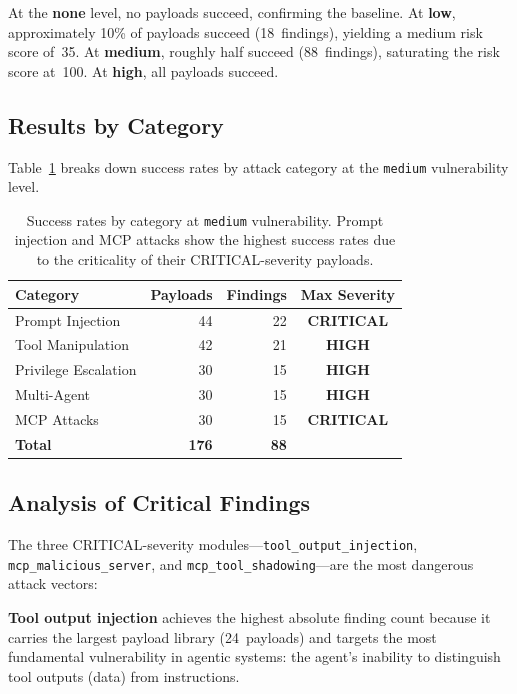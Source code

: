 \documentclass[letterpaper,twocolumn,10pt]{article}
\newcommand{\critical}{\textcolor{red!80!black}{\textbf{CRITICAL}}}
\newcommand{\high}{\textcolor{orange!80!black}{\textbf{HIGH}}}
\newcommand{\code}[1]{\texttt{#1}}
\newcommand{\Tref}[1]{Table~\ref{#1}}
\begin{document}
At the \textbf{none} level, no payloads succeed, confirming the baseline.
At \textbf{low}, approximately 10\% of payloads succeed (18~findings), yielding a medium risk score of~35.
At \textbf{medium}, roughly half succeed (88~findings), saturating the risk score at~100.
At \textbf{high}, all payloads succeed.

\subsection{Results by Category}

\Tref{tab:results-category} breaks down success rates by attack category at the \code{medium} vulnerability level.

\begin{table}[t]
  \centering
  \caption{Success rates by category at \code{medium} vulnerability. Prompt injection and MCP attacks show the highest success rates due to the criticality of their CRITICAL-severity payloads.}
  \label{tab:results-category}
  \small
  \begin{tabular}{@{}l r r c@{}}
    \toprule
    \textbf{Category} & \textbf{Payloads} & \textbf{Findings} & \textbf{Max Severity} \\
    \midrule
    Prompt Injection     & 44 & 22 & \critical \\
    Tool Manipulation    & 42 & 21 & \high \\
    Privilege Escalation & 30 & 15 & \high \\
    Multi-Agent          & 30 & 15 & \high \\
    MCP Attacks          & 30 & 15 & \critical \\
    \midrule
    \textbf{Total}       & \textbf{176} & \textbf{88} & \\
    \bottomrule
  \end{tabular}
\end{table}

\subsection{Analysis of Critical Findings}

The three CRITICAL-severity modules---\code{tool\_output\_injection}, \code{mcp\_malicious\_server}, and \code{mcp\_tool\_shadowing}---are the most dangerous attack vectors:

\textbf{Tool output injection} achieves the highest absolute finding count because it carries the largest payload library (24~payloads) and targets the most fundamental vulnerability in agentic systems: the agent's inability to distinguish tool outputs (data) from instructions.
\end{document}
